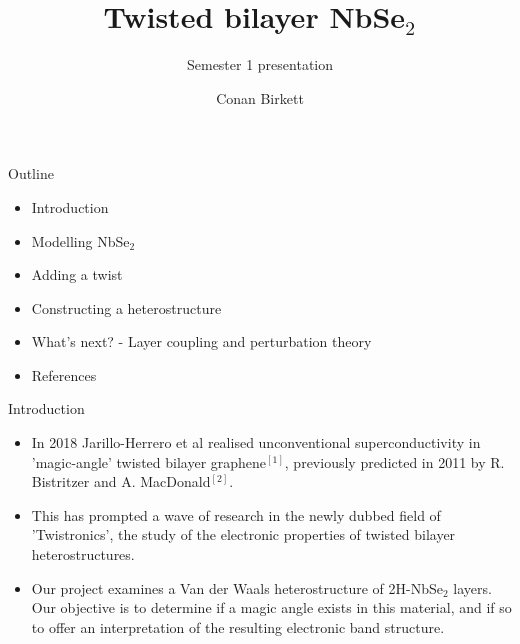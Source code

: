 \documentclass[9pt]{beamer}
\title{Twisted bilayer NbSe$_2$}
\subtitle{Semester 1 presentation}
\author{Conan Birkett}
\institute{University of Bath department of Physics}
\begin{document}
\begin{frame}
  \titlepage
\end{frame}

\begin{frame}{Outline}
  \begin{itemize}
      \item Introduction
      \item Modelling NbSe$_2$
      \item Adding a twist
      \item Constructing a heterostructure
      \item What's next? - Layer coupling and perturbation theory
      \item References
  \end{itemize}
\end{frame}

\begin{frame}{Introduction}
  \begin{itemize}
    \item In 2018 Jarillo-Herrero et al realised unconventional superconductivity in 'magic-angle' twisted bilayer graphene$^{[1]}$, previously predicted in 2011 by R. Bistritzer and A. MacDonald$^{[2]}$.

    \item This has prompted a wave of research in the newly dubbed field of 'Twistronics', the study of the electronic properties of twisted bilayer heterostructures.

    \item Our project examines a Van der Waals heterostructure of 2H-NbSe$_2$ layers. Our objective is to determine if a magic angle exists in this material, and if so to offer an interpretation of the resulting electronic band structure.
  \end{itemize}
\end{frame}
\end{document}
